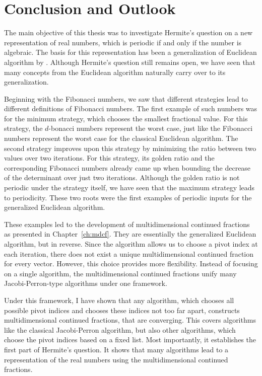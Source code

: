 \chapter{Conclusion and Outlook}
\label{ch:conclusion}

The main objective of this thesis
was to investigate Hermite's question
on a new representation of real numbers,
which is periodic if and only if the number is algebraic.
The basis for this representation has been a generalization of Euclidean
algorithm by \citeauthor{Klein24}.
Although Hermite's question still remains open,
we have seen that many concepts from the Euclidean algorithm naturally carry
over to its generalization.

Beginning with the Fibonacci numbers,
we saw that different strategies lead to different definitions of Fibonacci numbers.
The first example of such numbers was for the minimum strategy,
which chooses the smallest fractional value.
For this strategy, the $d$-bonacci numbers represent the worst case,
just like the Fibonacci numbers represent the worst case for the classical
Euclidean algorithm.
The second strategy improves upon this strategy by minimizing the ratio between two values over two iterations.
For this strategy, its golden ratio and the corresponding Fibonacci numbers
already came up when bounding the decrease of the determinant over just two iterations.
Although the golden ratio is not periodic under the strategy itself,
we have seen that the maximum strategy leads to periodicity.
These two roots were the first examples of periodic inputs for the generalized Euclidean algorithm.

These examples led to the development of multidimensional continued fractions
as presented in Chapter~\ref{ch:mdcf}.
They are essentially the generalized Euclidean algorithm, but in reverse.
Since the algorithm allows us to choose a pivot index at each iteration,
there does not exist a unique multidimensional continued fraction for every vector.
However, this choice provides more flexibility.
Instead of focusing on a single algorithm, the multidimensional continued
fractions unify many Jacobi-Perron-type algorithms under one framework.

Under this framework,
I have shown that any algorithm, which chooses all possible pivot indices and
chooses these indices not too far apart, constructs multidimensional continued fractions,
that are converging.
This covers algorithms like the classical Jacobi-Perron algorithm,
but also other algorithms, which choose the pivot indices based on a fixed list.
Most importantly, it establishes the first part of Hermite's question.
It shows that many algorithms lead to a representation of the real numbers
using the multidimensional continued fractions.

